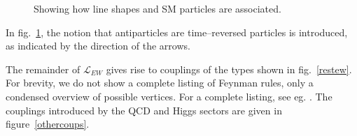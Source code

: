 \begin{figure}[hbtp]
\begin{minipage}[b]{.69\textwidth}
\centering\footnotesize
{}
\hspace{5em}
\vspace{1em}

\hspace{5em}
\end{minipage}
\hfill
\begin{minipage}[b]{.3\textwidth}
\caption{Showing how line shapes and SM particles are associated.}\label{ewprops}
\end{minipage}
\end{figure}

In fig.~\ref{ewprops}, the notion that antiparticles are time--reversed particles is introduced, as indicated by the direction of the arrows.

The remainder of $\mathcal{L}_\textit{EW}$ gives rise to couplings of the types shown in fig.~\ref{restew}. For brevity, we do not show a complete listing of Feynman rules, only a condensed overview of possible vertices. For a complete listing, see eg. \cite{allfeynrules}. The couplings introduced by the QCD and Higgs sectors are given in figure~\ref{othercoups}.

